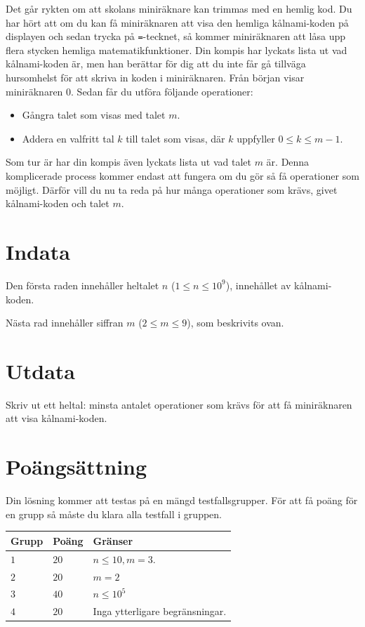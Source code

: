 Det går rykten om att skolans miniräknare kan trimmas med en hemlig kod.
Du har hört att om du kan få miniräknaren att visa den hemliga kålnami-koden på displayen och sedan
trycka på \texttt{=}-tecknet, så kommer miniräknaren att låsa upp flera
stycken hemliga matematikfunktioner.
Din kompis har lyckats lista ut vad kålnami-koden är, men han berättar för dig
att du inte får gå tillväga hursomhelst för att skriva in koden i miniräknaren.
Från början visar miniräknaren $0$. Sedan får du utföra följande operationer:
\begin{itemize}
  \item Gångra talet som visas med talet $m$.
  \item Addera en valfritt tal $k$ till talet som visas, där $k$ uppfyller $0 \leq k \leq m-1$.
\end{itemize}
Som tur är har din kompis även lyckats lista ut vad talet $m$ är. 
Denna komplicerade process kommer endast att fungera om du gör så få operationer
som möjligt. Därför vill du nu ta reda på hur många operationer som krävs,
givet kålnami-koden och talet $m$.

\section*{Indata}
Den första raden innehåller heltalet $n$ ($1 \le n \le 10^9$), innehållet av kålnami-koden.

Nästa rad innehåller siffran $m$ ($2 \leq m \leq 9$), som beskrivits ovan.

\section*{Utdata}
Skriv ut ett heltal: minsta antalet operationer som krävs för att få miniräknaren att visa
kålnami-koden.


\section*{Poängsättning}
Din lösning kommer att testas på en mängd testfallsgrupper.
För att få poäng för en grupp så måste du klara alla testfall i gruppen.

\noindent
\begin{tabular}{| l | l | p{12cm} |}
  \hline
  \textbf{Grupp} & \textbf{Poäng} & \textbf{Gränser} \\ \hline
  $1$    & $20$       & $n \leq 10, m=3$. \\ \hline
  $2$    & $20$       & $m=2$ \\ \hline
  $3$    & $40$       & $n \leq 10^5$ \\ \hline
  $4$    & $20$       & Inga ytterligare begränsningar. \\ \hline
\end{tabular}
